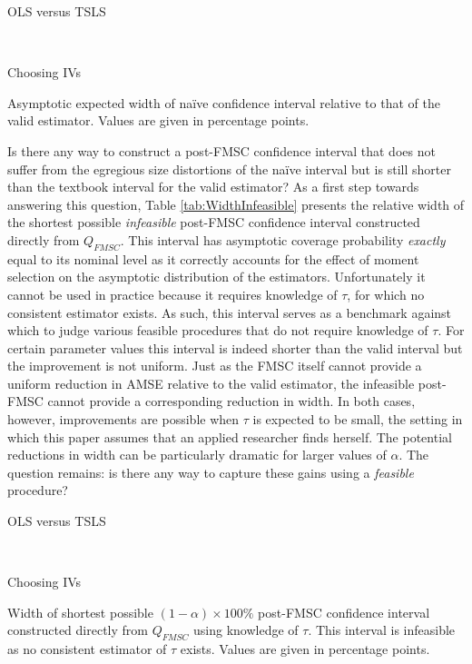 \begin{table}[h]
  \centering
  \begin{subtable}{0.48\textwidth}
    \caption{OLS versus TSLS}
    
  \end{subtable}
  ~
  \begin{subtable}{0.48\textwidth}
    \caption{Choosing IVs}
    
  \end{subtable}
  \caption{Asymptotic expected width of na\"{i}ve confidence interval relative to that of the valid estimator. Values are given in percentage points.}
  \label{tab:LimitNaiveWidth}
\end{table}

Is there any way to construct a post-FMSC confidence interval that does not suffer from the egregious size distortions of the na\"{i}ve interval but is still shorter than the textbook interval for the valid estimator?
As a first step towards answering this question, Table \ref{tab:WidthInfeasible} presents the relative width of the shortest possible \emph{infeasible} post-FMSC confidence interval constructed directly from $Q_{FMSC}$.
This interval has asymptotic coverage probability \emph{exactly} equal to its nominal level as it correctly accounts for the effect of moment selection on the asymptotic distribution of the estimators.
Unfortunately it cannot be used in practice because it requires knowledge of $\tau$, for which no consistent estimator exists.
As such, this interval serves as a benchmark against which to judge various feasible procedures that do not require knowledge of $\tau$.
For certain parameter values this interval is indeed shorter than the valid interval but the improvement is not uniform.
Just as the FMSC itself cannot provide a uniform reduction in AMSE relative to the valid estimator, the infeasible post-FMSC cannot provide a corresponding reduction in width.
In both cases, however, improvements are possible when $\tau$ is expected to be small, the setting in which this paper assumes that an applied researcher finds herself. 
The potential reductions in width can be particularly dramatic for larger values of $\alpha$.
The question remains: is there any way to capture these gains using a \emph{feasible} procedure?


\begin{table}[h]
  \centering
  \begin{subtable}{0.48\textwidth}
    \caption{OLS versus TSLS}
    
  \end{subtable}
  ~
  \begin{subtable}{0.48\textwidth}
    \caption{Choosing IVs}
    
  \end{subtable}
  \caption{Width of shortest possible $(1-\alpha)\times 100\%$ post-FMSC confidence interval constructed directly from $Q_{FMSC}$ using knowledge of $\tau$. This interval is infeasible as no consistent estimator of $\tau$ exists. Values are given in percentage points.}
  \label{tab:WidthInfeasible}
\end{table}

